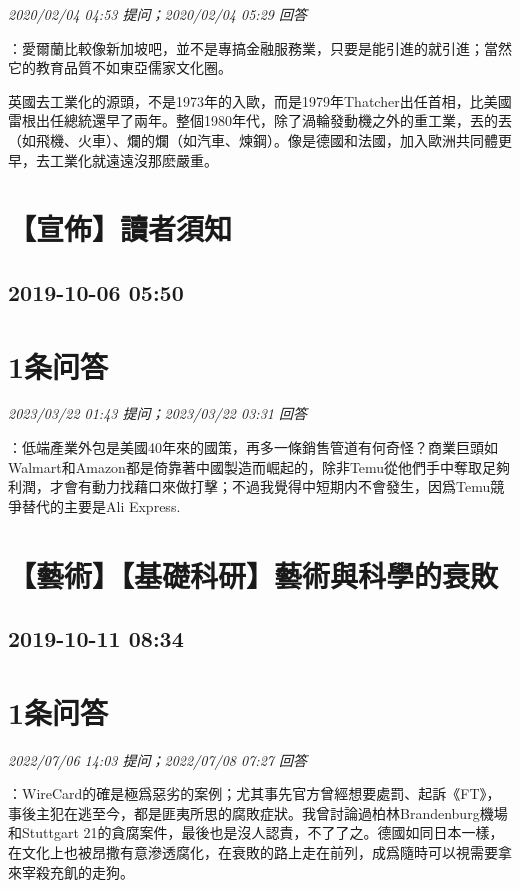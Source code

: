 \documentclass[twocolumn]{ctexart}
\begin{document}
\textit{\hfill\noindent\small 2020/02/04 04:53 提问；2020/02/04 05:29 回答}

：愛爾蘭比較像新加坡吧，並不是專搞金融服務業，只要是能引進的就引進；當然它的教育品質不如東亞儒家文化圈。

英國去工業化的源頭，不是1973年的入歐，而是1979年Thatcher出任首相，比美國雷根出任總統還早了兩年。整個1980年代，除了渦輪發動機之外的重工業，丟的丟（如飛機、火車）、爛的爛（如汽車、煉鋼）。像是德國和法國，加入歐洲共同體更早，去工業化就遠遠沒那麽嚴重。
\\


\section{【宣佈】讀者須知}
\subsection{2019-10-06 05:50}


\section{1条问答}

\textit{\hfill\noindent\small 2023/03/22 01:43 提问；2023/03/22 03:31 回答}

：低端產業外包是美國40年來的國策，再多一條銷售管道有何奇怪？商業巨頭如Walmart和Amazon都是倚靠著中國製造而崛起的，除非Temu從他們手中奪取足夠利潤，才會有動力找藉口來做打擊；不過我覺得中短期内不會發生，因爲Temu競爭替代的主要是Ali Express.
\\


\section{【藝術】【基礎科研】藝術與科學的衰敗}
\subsection{2019-10-11 08:34}


\section{1条问答}

\textit{\hfill\noindent\small 2022/07/06 14:03 提问；2022/07/08 07:27 回答}

：WireCard的確是極爲惡劣的案例；尤其事先官方曾經想要處罰、起訴《FT》，事後主犯在逃至今，都是匪夷所思的腐敗症狀。我曾討論過柏林Brandenburg機場和Stuttgart 21的貪腐案件，最後也是沒人認責，不了了之。德國如同日本一樣，在文化上也被昂撒有意滲透腐化，在衰敗的路上走在前列，成爲隨時可以視需要拿來宰殺充飢的走狗。
\\
\end{document}
